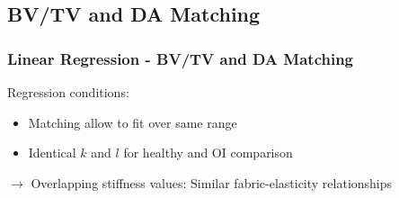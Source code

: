 \documentclass[xcolor=table,11pt]{beamer}
\begin{document}

\subsection{BV/TV and DA Matching}

\begin{frame}
	\frametitle{Linear Regression - BV/TV and DA Matching}
	
	Regression conditions:
	\begin{itemize}
		\item Matching allow to fit over same range
		\item Identical $k$ and $l$ for healthy and OI comparison
	\end{itemize}

	\vfill

	\begin{table}[]
		\centering
		\caption{Summary of BV/TV and DA matched data set linear regression\vspace{-1em}}
		\label{Table3}
	\end{table}

	\vfill
	
	$\rightarrow$ Overlapping stiffness values: Similar fabric-elasticity relationships
\end{frame}
\end{document}
